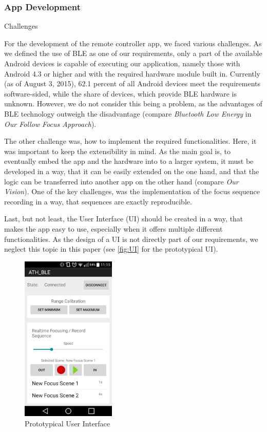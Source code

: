 \documentclass{sigchi}
\begin{document}
\subsubsection{App Development}
Challenges

For the development of the remote controller app, we faced various challenges. As we defined the use of BLE as one of our requirements, only a part of the available Android devices is capable of executing our application, namely those with Android 4.3 or higher and with the required hardware module built in. Currently (as of August 3, 2015), 62.1 percent of all Android devices meet the requirements software-sided, while the share of devices, which provide BLE hardware is unknown. \cite{devand} However, we do not consider this being a problem, as the advantages of BLE technology outweigh the disadvantage (compare \textit{Bluetooth Low Energy} in \textit{Our Follow Focus Approach}).

The other challenge was, how to implement the required functionalities. Here, it was important to keep the extensibility in mind. As the main goal is, to eventually embed the app and the hardware into to a larger system, it must be developed in a way, that it can be easily extended on the one hand, and that the logic can be transferred into another app on the other hand (compare \textit{Our Vision}). One of the key challenges, was the implementation of the focus sequence recording in a way, that sequences are exactly reproducible. 

Last, but not least, the User Interface (UI) should be created in a way, that makes the app easy to use, especially when it offers multiple different functionalities. As the design of a UI is not directly part of our requirements, we neglect this topic in this paper (see \autoref{fig:UI} for the prototypical UI). 

\begin{figure}
  \center
  \includegraphics[width=0.4\textwidth]{ui.png}
  \caption{Prototypical User Interface}
  \label{fig:UI}
\end{figure} 
\end{document}
